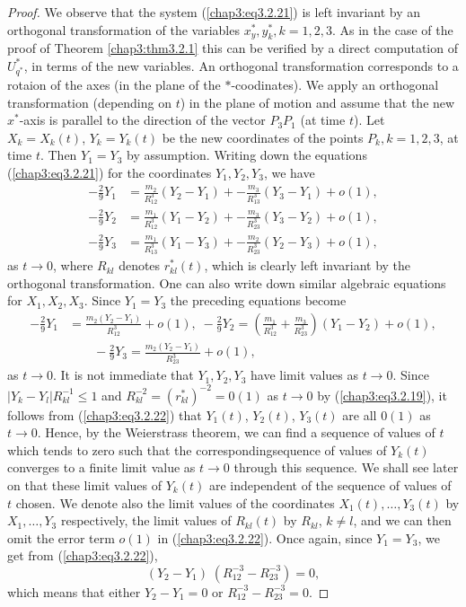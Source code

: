 \begin{proof}
We observe that the system (\ref{chap3:eq3.2.21}) is left invariant by
an orthogonal transformation of the variables $x^*_y, y^*_k, k =
1,2,3$. As in the case of the proof of Theorem \ref{chap3:thm3.2.1}
this can be verified by a direct computation of $U^*_{q^*}$, in terms
of the new variables. An orthogonal transformation corresponds to a
rotaion of the axes (in the plane of the $*$-coodinates). We apply an
orthogonal transformation (depending on $t$) in the\pageoriginale
plane of motion and assume that the new $x^*$-axis is parallel to the
direction of the vector $P_3 P_1$  (at time $t$). Let $X_k = X_k (t)$,
$Y_k = Y_k (t)$ be the new coordinates of the points $P_k, k = 1,2,3$,
at time $t$. Then $Y_1 =  Y_3$ by assumption. Writing down the
equations (\ref{chap3:eq3.2.21}) for the coordinates $Y_1, Y_2, Y_3$,
we have  
\begin{align*}
- \frac{2}{9} Y_1 & = \frac{m_2}{R^3_{12}} (Y_2 - Y_1) +
- \frac{m_3}{R^3_{13}} (Y_3 - Y_1) + o(1),\\ 
- \frac{2}{9} Y_2 & = \frac{m_1}{R^3_{12}} (Y_1 - Y_2) +
- \frac{m_3}{R^3_{23}} (Y_3 - Y_2) + o(1),\\ 
- \frac{2}{9} Y_3 & = \frac{m_1}{R^3_{13}} (Y_1 - Y_3) +
- \frac{m_2}{R^3_{23}} (Y_2 - Y_3) + o(1), 
\end{align*}
as  $t \to 0$, where $R_{kl}$ denotes $r^*_{kl}(t)$, which is clearly
left invariant by the orthogonal transformation. One can also write
down similar algebraic equations for $X_1, X_2, X_3 $. Since $Y_1 =
Y_3$ the preceding equations become 
\begin{align*}
- \frac{2}{9} Y_1 & = \frac{m_2 (Y_2 - Y_1)}{R^3_{12}} + o(1), \; -
\frac{2}{9} Y_2 = \left(\frac{m_1}{R^3_{12}} + \frac{m_3}{R^3_{23}}
\right) (Y_1 - Y_2) + o(1), \\ 
& \qquad - \frac{2}{9} Y_3  = \frac{m_2 (Y_2 - Y_1)}{R^3_{23}} + o
(1), \tag{3.2.22}\label{chap3:eq3.2.22} 
\end{align*}
as $t \to 0$. It is not immediate that $Y_1, Y_2, Y_3$ have limit
values as $t \to 0$. Since $|Y_k - Y_l|R^{-1}_{kl} \leq 1$ and
$R^{-2}_{kl} = (r^*_{kl})^{-2} = 0(1)$ as $t \to 0$ by
(\ref{chap3:eq3.2.19}), it follows from (\ref{chap3:eq3.2.22}) that
$Y_1(t)$, $Y_2(t)$, $Y_3(t)$ are all $0(1)$  as $t \to 0$. Hence, by
the Weierstrass theorem, we can find a sequence of values of $t$ which
tends to zero such that the corresponding\pageoriginale sequence of
values of $Y_k(t)$ converges to a finite limit value as $t \to 0$
through this sequence. We shall see later on that these limit values
of $Y_k(t)$ are independent of the sequence of values of $t$
chosen. We denote also the limit values of the coordinates $X_1(t),
\ldots, Y_3(t)$ by $X_1, \ldots, Y_3$ respectively, the limit values
of $R_{kl}(t)$ by $R_{kl}$, $k \neq l$, and we can then omit the error
term $o(1)$ in (\ref{chap3:eq3.2.22}). Once again, since $Y_1 = Y_3$,
we get from (\ref{chap3:eq3.2.22}), 
$$
(Y_2 - Y_1) \; (R^{-3}_{12} - R^{-3}_{23}) = 0, 
$$
which means that either $Y_2 - Y_1 = 0$ or $R^{-3}_{12} - R^{-3}_{23}
=0$. 


\end{proof}
